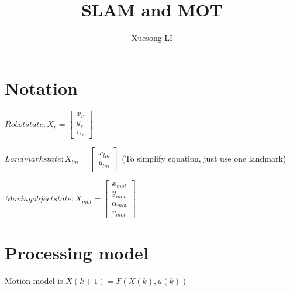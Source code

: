 \documentclass[11pt,a4paper]{article}
\begin{document}
\title{SLAM and MOT}
\author{Xuesong LI}
\date{}
\maketitle

\section{Notation}

$ Robot state: X_{r} = \begin{bmatrix} x_{r} \\ y_{r} \\ \alpha_{r} \end{bmatrix} $

\noindent$ Landmark state: X_{lm} =  \begin{bmatrix} x_{lm} \\ y_{lm} \end{bmatrix} $ (To simplify equation, just use one landmark)

\noindent$ Moving object state: X_{mot} = \begin{bmatrix} x_{mot} \\ y_{mot} \\ \alpha_{mot} \\ v_{mot} \end{bmatrix} $


\section{Processing model}
Motion model is   $X(k+1) = F(X(k), u(k))$
\\
\end{document}
